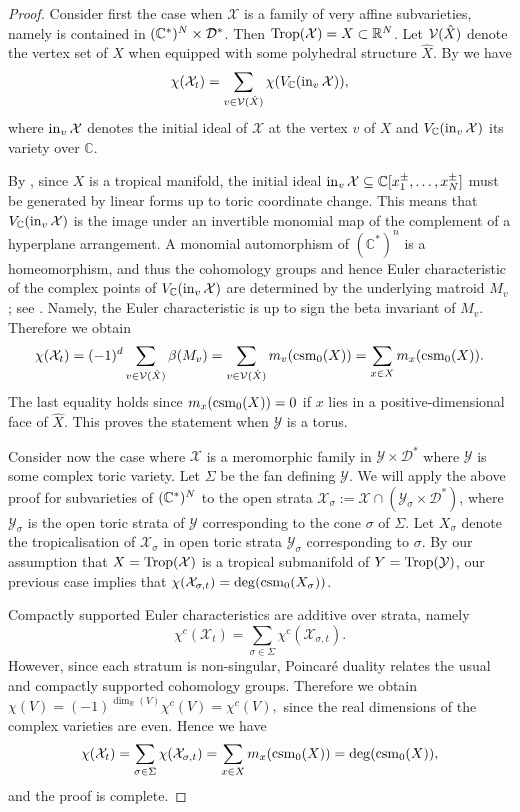 \begin{proof}
Consider first the case when  $\mathcal{X}$ is a family of very affine subvarieties, namely is contained in $(\mathbb{C}^*)^N \times \mathcal{D^*}$. 
 Then $\operatorname{Trop}(\mathcal{X}) = X \subset \mathbb{R}^N$. Let   ${{\mathcal V}}(\hat{X})$ denote the vertex set of $X$ when equipped with some polyhedral structure $\hat{X}$. 
 By \cite[Corollary 1.4]{KatzStapledon} we have
 $$\chi(\mathcal{X}_t)  = \sum_{v \in {{\mathcal V}}(\hat{X})} \chi(V_{\mathbb{C}}(\operatorname{in}_v \mathcal{X})),$$
 where $\operatorname{in}_v \mathcal{X}$ denotes the initial ideal of $\mathcal X$ at the vertex $v $ of $X$ and $V_{\mathbb{C}}(\operatorname{in}_v \mathcal{X})$ its variety over $\mathbb{C}$.
 
By \cite[Proposition 4.2]{KatzPayne}, since $X$ is a tropical manifold, the initial ideal $\operatorname{in}_v \mathcal{X} \subseteq \mathbb{C}[x_1^{\pm}, \dots, x_N^{\pm}]$ must be generated by linear forms up to toric coordinate change. This means that $V_{\mathbb{C}}(\operatorname{in}_v \mathcal{X})$ is the image under an invertible monomial map of the complement of a hyperplane arrangement. A monomial automorphism of $(\mathbb{C}^*)^n$ is a homeomorphism, and thus the cohomology groups and hence Euler characteristic of the complex points of $V_{\mathbb{C}}(\operatorname{in}_v \mathcal{X})$ are determined by the underlying matroid $M_v$; see  \cite{OrlikTerao}. 
 Namely, the Euler characteristic is up to sign the beta invariant of $M_v$. Therefore we obtain   
  $$\chi(\mathcal{X}_t)  = (-1)^d \sum_{v \in {{\mathcal V}}(\hat X)} \beta(M_v) = 
  \sum_{v \in {{\mathcal V}}(\hat X)} m_v(\operatorname{csm}_0(X)) = \sum_{x \in X} m_x(\operatorname{csm}_0(X)).$$ 
  The last equality holds since $m_x(\operatorname{csm}_0(X)) = 0$ if $x$ lies in a positive-dimensional face of $\hat X$. 
 This proves the statement when $\mathcal{Y}$ is a torus. 
  
Consider now the case where $\mathcal{X}$ is a meromorphic family in 
$\mathcal{Y} \times \mathcal{D}^*$ 
where $\mathcal{Y}$ is some complex toric variety. 
  Let $\Sigma$ be the fan defining $\mathcal{Y}$.  We will apply the above proof for subvarieties of $(\mathbb{C}^*)^N$ to the open strata $\mathcal{X}_{\sigma} := \mathcal{X} \cap (\mathcal{Y}_{\sigma} \times \mathcal{D}^*)$, where $\mathcal{Y}_{\sigma}$ is the open toric strata of $\mathcal{Y}$ corresponding to the cone  $\sigma $ of $\Sigma$. Let $X_{\sigma}$ denote the tropicalisation of $\mathcal{X}_{\sigma}$ in open toric strata
  $\mathcal{Y}_{\sigma}$ corresponding to $\sigma$. 
  By our assumption that $X = \operatorname{Trop}(\mathcal{X})$ is a tropical submanifold of $Y = \operatorname{Trop}(\mathcal{Y})$, our previous case implies that $\chi( \mathcal{X}_{\sigma,t}) = \deg(\operatorname{csm}_0(X_{\sigma}))$.
  
Compactly supported Euler characteristics are  additive over strata, namely 
$$\chi^c(\mathcal{X}_t) =   \sum_{\sigma \in \Sigma} \chi^c( \mathcal{X}_{\sigma,t}).$$
However, since each stratum is non-singular, Poincar\'e duality relates the usual and compactly supported cohomology groups. Therefore we obtain 
$\chi(V) = (-1)^{\dim_{\mathbb{R}} (V)} \chi^c(V) = \chi^c(V),$ since the real dimensions of the complex varieties are even. 
Hence we have  
$$\chi (\mathcal{X}_t) = \sum_{\sigma \in \Sigma}   \chi( \mathcal{X}_{\sigma,t}) = \sum_{x \in X}  m_x({\operatorname{csm}_0(X)}) = \deg(\operatorname{csm}_0(X)),$$
and the proof is complete. 
 \end{proof}
 
